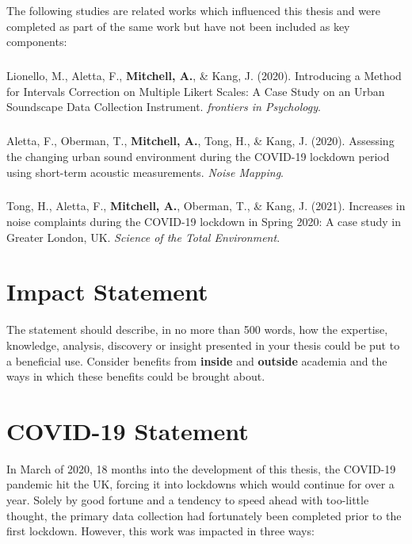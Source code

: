 \documentclass[twoside,fontsize=12pt,titlepage]{scrbook}
\begin{document}
\newpage
The following studies are related works which influenced this thesis and were completed as part of the same work but have not been included as key components:

\paragraph*{}Lionello, M., Aletta, F., \textbf{Mitchell, A.}, \& Kang, J. (2020). Introducing a Method for Intervals Correction on Multiple Likert Scales: A Case Study on an Urban Soundscape Data Collection Instrument. \emph{frontiers in Psychology}.

\paragraph*{}Aletta, F., Oberman, T., \textbf{Mitchell, A.}, Tong, H., \& Kang, J. (2020). Assessing the changing urban sound environment during the COVID-19 lockdown period using short-term acoustic measurements. \emph{Noise Mapping}.

\paragraph*{}Tong, H., Aletta, F., \textbf{Mitchell, A.}, Oberman, T., \& Kang, J. (2021). Increases in noise complaints during the COVID-19 lockdown in Spring 2020: A case study in Greater London, UK. \emph{Science of the Total Environment}.



\chapter*{Impact Statement}
The statement should describe, in no more than 500 words, how the expertise, knowledge, analysis, discovery or insight presented in your thesis could be put to a beneficial use. Consider benefits from \textbf{inside} and \textbf{outside} academia and the ways in which these benefits could be brought about.

\chapter*{COVID-19 Statement}

In March of 2020, 18 months into the development of this thesis, the COVID-19 pandemic hit the UK, forcing it into lockdowns which would continue for over a year. Solely by good fortune and a tendency to speed ahead with too-little thought, the primary data collection had fortunately been completed prior to the first lockdown. However, this work was impacted in three ways:
\end{document}
